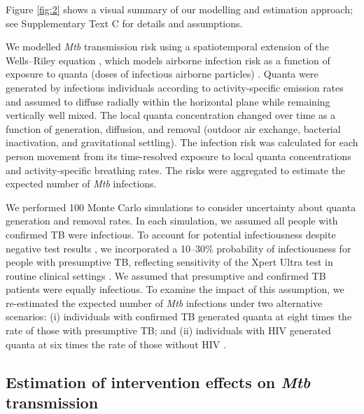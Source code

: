 \documentclass[11pt]{article}
\begin{document}
Figure \ref{fig:2} shows a visual summary of our modelling and estimation approach; see Supplementary Text C for details and assumptions.

We modelled \emph{Mtb} transmission risk using a spatiotemporal extension of the Wells--Riley equation \cite{banholzer2025PLOSComputBiol}, which models airborne infection risk as a function of exposure to quanta (doses of infectious airborne particles) \cite{yates2016LancetInfectDis,riley1978AmJEpidemiol,rudnick2003IndoorAira}. Quanta were generated by infectious individuals according to activity-specific emission rates and assumed to diffuse radially within the horizontal plane while remaining vertically well mixed. The local quanta concentration changed over time as a function of generation, diffusion, and removal (outdoor air exchange, bacterial inactivation, and gravitational settling). The infection risk was calculated for each person movement from its time-resolved exposure to local quanta concentrations and activity-specific breathing rates. The risks were aggregated to estimate the expected number of \emph{Mtb} infections.

We performed 100 Monte Carlo simulations to consider uncertainty about quanta generation and removal rates. In each simulation, we assumed all people with confirmed TB were infectious. To account for potential infectiousness despite negative test results \cite{patterson2024ProcNatlAcadSci}, we incorporated a 10--30\% probability of infectiousness for people with presumptive TB, reflecting sensitivity of the Xpert Ultra test in routine clinical settings \cite{dorman2018LancetInfectDis}. We assumed that presumptive and confirmed TB patients were equally infectious. To examine the impact of this assumption, we re-estimated the expected number of \emph{Mtb} infections under two alternative scenarios: (i) individuals with confirmed TB generated quanta at eight times the rate of those with presumptive TB;\cite{escombe2008PLOSMed} and (ii) individuals with HIV generated quanta at six times the rate of those without HIV \cite{escombe2007ClinInfectDis}.

\subsection{\texorpdfstring{Estimation of intervention effects on \emph{Mtb} transmission}{Estimation of intervention effects on Mtb transmission}}\label{estimation-of-intervention-effects-on-mtb-transmission}
\end{document}
